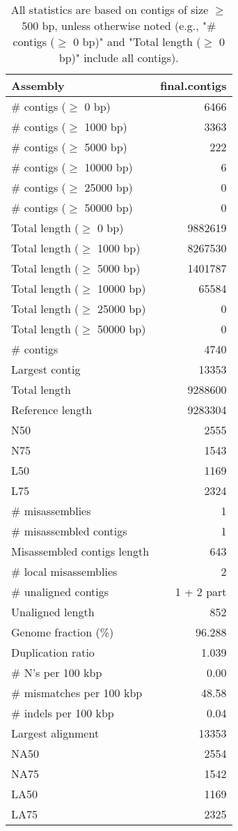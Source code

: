 \documentclass[12pt,a4paper]{article}
\begin{document}
\begin{table}[ht]
\begin{center}
\caption{All statistics are based on contigs of size $\geq$ 500 bp, unless otherwise noted (e.g., "\# contigs ($\geq$ 0 bp)" and "Total length ($\geq$ 0 bp)" include all contigs).}
\begin{tabular}{|l*{1}{|r}|}
\hline
Assembly & final.contigs \\ \hline
\# contigs ($\geq$ 0 bp) & 6466 \\ \hline
\# contigs ($\geq$ 1000 bp) & 3363 \\ \hline
\# contigs ($\geq$ 5000 bp) & 222 \\ \hline
\# contigs ($\geq$ 10000 bp) & 6 \\ \hline
\# contigs ($\geq$ 25000 bp) & 0 \\ \hline
\# contigs ($\geq$ 50000 bp) & 0 \\ \hline
Total length ($\geq$ 0 bp) & 9882619 \\ \hline
Total length ($\geq$ 1000 bp) & 8267530 \\ \hline
Total length ($\geq$ 5000 bp) & 1401787 \\ \hline
Total length ($\geq$ 10000 bp) & 65584 \\ \hline
Total length ($\geq$ 25000 bp) & 0 \\ \hline
Total length ($\geq$ 50000 bp) & 0 \\ \hline
\# contigs & 4740 \\ \hline
Largest contig & 13353 \\ \hline
Total length & 9288600 \\ \hline
Reference length & 9283304 \\ \hline
N50 & 2555 \\ \hline
N75 & 1543 \\ \hline
L50 & 1169 \\ \hline
L75 & 2324 \\ \hline
\# misassemblies & 1 \\ \hline
\# misassembled contigs & 1 \\ \hline
Misassembled contigs length & 643 \\ \hline
\# local misassemblies & 2 \\ \hline
\# unaligned contigs & 1 + 2 part \\ \hline
Unaligned length & 852 \\ \hline
Genome fraction (\%) & 96.288 \\ \hline
Duplication ratio & 1.039 \\ \hline
\# N's per 100 kbp & 0.00 \\ \hline
\# mismatches per 100 kbp & 48.58 \\ \hline
\# indels per 100 kbp & 0.04 \\ \hline
Largest alignment & 13353 \\ \hline
NA50 & 2554 \\ \hline
NA75 & 1542 \\ \hline
LA50 & 1169 \\ \hline
LA75 & 2325 \\ \hline
\end{tabular}
\end{center}
\end{table}
\end{document}

